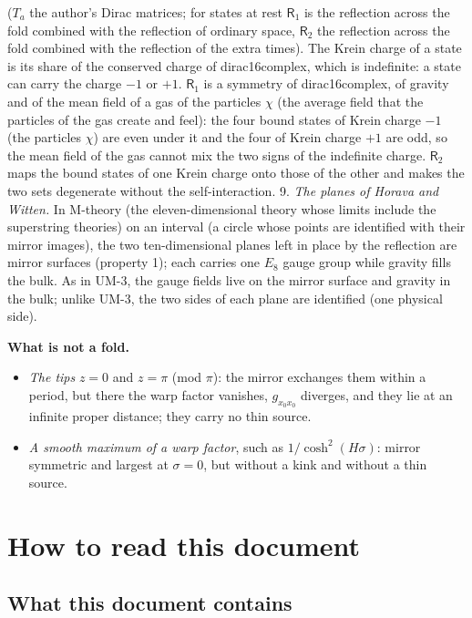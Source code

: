 \documentclass[
  10pt,
]{article}
\providecommand{\tightlist}{%
  \setlength{\itemsep}{0pt}\setlength{\parskip}{0pt}}
\begin{document}
(\(T_a\) the author's Dirac matrices; for states at rest
\(\mathsf{R}_1\) is the reflection across the fold combined with the
reflection of ordinary space, \(\mathsf{R}_2\) the reflection across the
fold combined with the reflection of the extra times). The Krein charge
of a state is its share of the conserved charge of dirac16complex, which
is indefinite: a state can carry the charge \(-1\) or \(+1\).
\(\mathsf{R}_1\) is a symmetry of dirac16complex, of gravity and of the
mean field of a gas of the particles \(\chi\) (the average field that
the particles of the gas create and feel): the four bound states of
Krein charge \(-1\) (the particles \(\chi\)) are even under it and the
four of Krein charge \(+1\) are odd, so the mean field of the gas cannot
mix the two signs of the indefinite charge. \(\mathsf{R}_2\) maps the
bound states of one Krein charge onto those of the other and makes the
two sets degenerate without the self-interaction. 9. \emph{The planes of
Horava and Witten.} In M-theory (the eleven-dimensional theory whose
limits include the superstring theories) on an interval (a circle whose
points are identified with their mirror images), the two ten-dimensional
planes left in place by the reflection are mirror surfaces (property 1);
each carries one \(E_8\) gauge group while gravity fills the bulk. As in
UM-3, the gauge fields live on the mirror surface and gravity in the
bulk; unlike UM-3, the two sides of each plane are identified (one
physical side).

\textbf{What is not a fold.}

\begin{itemize}
\tightlist
\item
  \emph{The tips} \(z = 0\) and \(z = \pi\) (mod \(\pi\)): the mirror
  exchanges them within a period, but there the warp factor vanishes,
  \(g_{x_0x_0}\) diverges, and they lie at an infinite proper distance;
  they carry no thin source.
\item
  \emph{A smooth maximum of a warp factor}, such as
  \(1/\cosh^2(H\sigma)\): mirror symmetric and largest at
  \(\sigma = 0\), but without a kink and without a thin source.
\end{itemize}

\hypertarget{how-to-read-this-document}{%
\section{How to read this document}\label{how-to-read-this-document}}

\hypertarget{what-this-document-contains}{%
\subsection{What this document
contains}\label{what-this-document-contains}}
\end{document}
